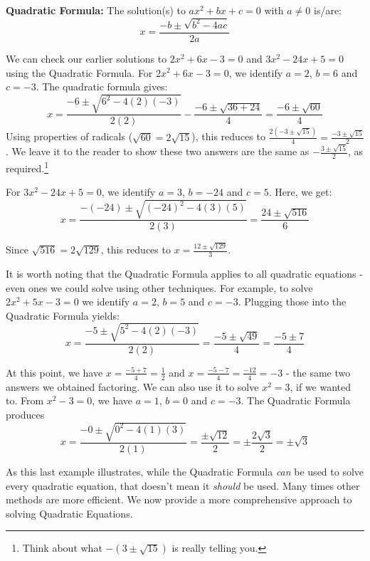 \documentclass{ximera}
\begin{document}
\begin{theorem}\label{quadraticformula}  \textbf{Quadratic Formula:} The solution(s) to $ax^2 + bx + c = 0$ with $a \neq 0$ is/are: \[x  = \dfrac{-b \pm \sqrt{b^2 - 4ac}}{2a} \]

\end{theorem}


\medskip

We can check our earlier solutions to $2x^2 + 6x - 3 = 0$ and $3x^2 - 24x + 5 = 0$ using the Quadratic Formula.  For $2x^2 + 6x - 3 = 0$, we identify $a = 2$, $b = 6$ and $c = -3$.  The quadratic formula gives: \[ x = \dfrac{-6 \pm \sqrt{6^2 - 4(2)(-3)}}{2(2)} - \dfrac{-6 \pm \sqrt{36 + 24}}{4} = \dfrac{-6 \pm \sqrt{60}}{4} \] Using properties of radicals ($\sqrt{60} = 2 \sqrt{15}$), this reduces to $\frac{2(-3 \pm \sqrt{15})}{4} =\frac{-3 \pm \sqrt{15}}{2}$. We leave it to the reader to show these two answers are the same as $-\frac{3 \pm \sqrt{15}}{2}$,  as required.\footnote{Think about what $-(3 \pm \sqrt{15})$ is really telling you.}  

\smallskip

For $3x^2 - 24x + 5 = 0$, we identify $a = 3$, $b = -24$ and $c = 5$.  Here, we get: \[ x = \dfrac{-(-24) \pm \sqrt{(-24)^2 - 4(3)(5)}}{2(3)} = \dfrac{24 \pm \sqrt{516}}{6} \]

Since $\sqrt{516} = 2\sqrt{129}$, this reduces to  $x = \frac{12 \pm \sqrt{129}}{3}$. 

\smallskip

It is worth noting that the Quadratic Formula applies to all quadratic equations - even ones we could solve using other techniques.  For example, to solve $2x^2 + 5x - 3 = 0$  we identify $a = 2$, $b = 5$ and $c = -3$.  Plugging those into the Quadratic Formula yields: \[ x = \dfrac{-5 \pm \sqrt{5^2 - 4(2)(-3)}}{2(2)} = \dfrac{-5 \pm \sqrt{49}}{4} = \dfrac{-5 \pm 7}{4} \]

At this point, we have $x = \frac{-5+7}{4} = \frac{1}{2}$ and $x = \frac{-5-7}{4} = \frac{-12}{4} = -3$ - the same two answers we obtained factoring.  We can also use it to solve $x^2 = 3$, if we wanted to.  From $x^2 -3 = 0$, we have $a = 1$, $b = 0$ and $c = -3$.  The Quadratic Formula produces \[ x = \dfrac{-0 \pm \sqrt{0^2 - 4(1)(3)}}{2(1)} = \dfrac{\pm\sqrt{12}}{2} = \pm \dfrac{2\sqrt{3}}{2} = \pm \sqrt{3}\]

As this last example illustrates, while the  Quadratic Formula \textit{can} be used to solve every quadratic equation, that doesn't mean it \textit{should} be used.  Many times other methods are more efficient.  We now provide a more comprehensive approach to solving Quadratic Equations.  
\end{document}

